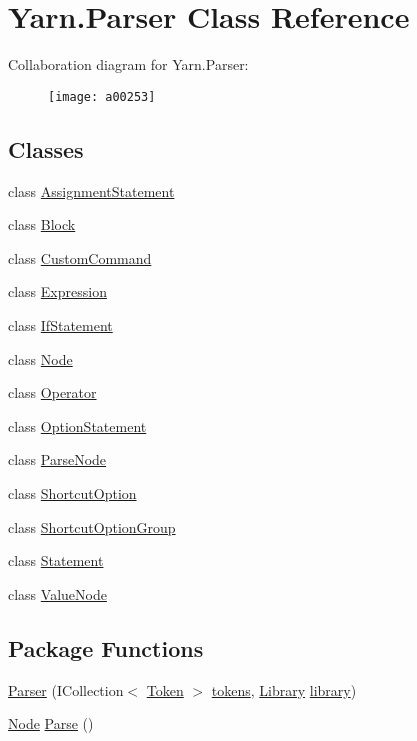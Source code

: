 \hypertarget{a00064}{\section{Yarn.\-Parser Class Reference}
\label{a00064}
}


Collaboration diagram for Yarn.\-Parser\-:
\nopagebreak
\begin{figure}[H]
\begin{center}
\leavevmode
\texttt{[image: a00253]}
\end{center}
\end{figure}
\subsection*{Classes}
\begin{DoxyCompactItemize}
\item 
class \hyperlink{a00019}{Assignment\-Statement}
\item 
class \hyperlink{a00022}{Block}
\item 
class \hyperlink{a00032}{Custom\-Command}
\item 
class \hyperlink{a00040}{Expression}
\item 
class \hyperlink{a00043}{If\-Statement}
\item 
class \hyperlink{a00054}{Node}
\item 
class \hyperlink{a00058}{Operator}
\item 
class \hyperlink{a00061}{Option\-Statement}
\item 
class \hyperlink{a00063}{Parse\-Node}
\item 
class \hyperlink{a00070}{Shortcut\-Option}
\item 
class \hyperlink{a00071}{Shortcut\-Option\-Group}
\item 
class \hyperlink{a00076}{Statement}
\item 
class \hyperlink{a00087}{Value\-Node}
\end{DoxyCompactItemize}
\subsection*{Package Functions}
\begin{DoxyCompactItemize}
\item 
\hyperlink{a00064_acd2714b911fb5e7c38f0e07a9dc1af58}{Parser} (I\-Collection$<$ \hyperlink{a00079}{Token} $>$ \hyperlink{a00064_a1a4de646937057988b59d2ff8035eae3}{tokens}, \hyperlink{a00049}{Library} \hyperlink{a00064_a1313951b09177a1c83b6cf035139197a}{library})
\item 
\hyperlink{a00054}{Node} \hyperlink{a00064_a811cc7226f4f4a2f3440cdb67ad14468}{Parse} ()
\end{DoxyCompactItemize}
